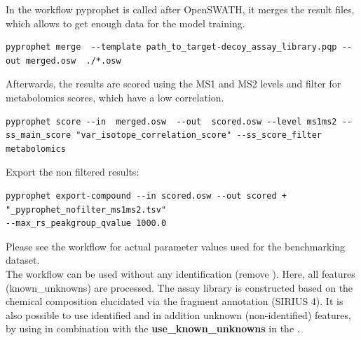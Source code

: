 \noindent In the workflow pyprophet is called after OpenSWATH, it merges the result files, which allows to get enough data for the model training. 

\begin{listing}
\begin{verbatim}
pyprophet merge  --template path_to_target-decoy_assay_library.pqp --out merged.osw  ./*.osw
\end{verbatim}
\end{listing}

\noindent Afterwards, the results are scored using the MS1 and MS2 levels and filter for metabolomics scores, which have a low correlation. 

\begin{listing}
\begin{verbatim}
pyprophet score --in  merged.osw  --out  scored.osw --level ms1ms2 --ss_main_score "var_isotope_correlation_score" --ss_score_filter metabolomics
\end{verbatim}
\end{listing}
\noindent Export the non filtered results: 

\begin{listing}
\begin{verbatim}
pyprophet export-compound --in scored.osw --out scored + "_pyprophet_nofilter_ms1ms2.tsv" 
--max_rs_peakgroup_qvalue 1000.0
\end{verbatim}
\end{listing}
\noindent Please see the workflow for actual parameter values used for the benchmarking dataset. \\

\noindent  The workflow can be used without any identification (remove ). Here, all features (known\_unknowns) are processed. The assay library is constructed based on the chemical composition elucidated via the fragment annotation (SIRIUS 4). It is also possible to use identified and in addition unknown (non-identified) features, by using  in combination with the \textbf{use_known_unknowns} in the .  
